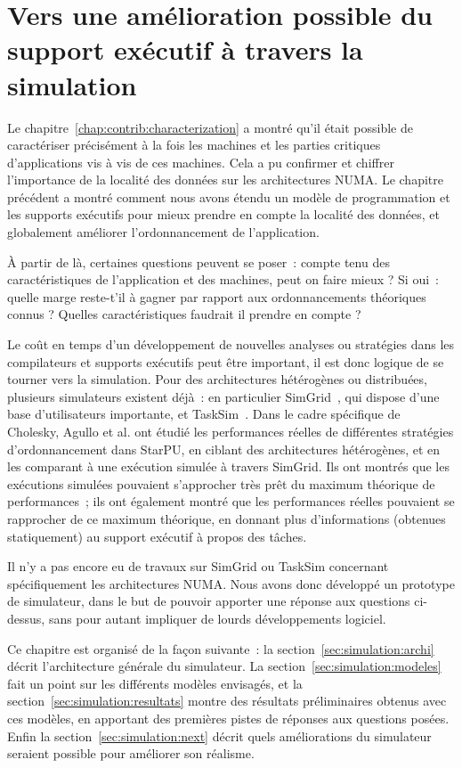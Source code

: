 \chapter{Vers une amélioration possible du support exécutif à travers la simulation}\label{chap:simulation}
\chaptertoc


Le chapitre~\ref{chap:contrib:characterization} a montré qu'il était possible de caractériser précisément à la fois les machines et les parties critiques d'applications vis à vis de ces machines.
Cela a pu confirmer et chiffrer l'importance de la localité des données sur les architectures NUMA.
Le chapitre précédent a montré comment nous avons étendu un modèle de programmation et les supports exécutifs pour mieux prendre en compte la localité des données, et globalement améliorer l'ordonnancement de l'application.

À partir de là, certaines questions peuvent se poser~: compte tenu des caractéristiques de l'application et des machines, peut on faire mieux ?
Si oui~: quelle marge reste-t'il à gagner par rapport aux ordonnancements théoriques connus ? Quelles caractéristiques faudrait il prendre en compte ?

Le coût en temps d'un développement de nouvelles analyses ou stratégies dans les compilateurs et supports exécutifs peut être important, il est donc logique de se tourner vers la simulation.
Pour des architectures hétérogènes ou distribuées, plusieurs simulateurs existent déjà~: en particulier SimGrid~\cite{Casanova2001}, qui dispose d'une base d'utilisateurs importante, et TaskSim~\cite{Rico2010}.
Dans le cadre spécifique de Cholesky, Agullo et al.\cite{Agullo2015} ont étudié les performances réelles de différentes stratégies d'ordonnancement dans StarPU, en ciblant des architectures hétérogènes, et en les comparant à une exécution simulée à travers SimGrid.
Ils ont montrés que les exécutions simulées pouvaient s'approcher très prêt du maximum théorique de performances~; ils ont également montré que les performances réelles pouvaient se rapprocher de ce maximum théorique, en donnant plus d'informations (obtenues statiquement) au support exécutif à propos des tâches.

Il n'y a pas encore eu de travaux sur SimGrid ou TaskSim concernant spécifiquement les architectures NUMA.
Nous avons donc développé un prototype de simulateur, dans le but de pouvoir apporter une réponse aux questions ci-dessus, sans pour autant impliquer de lourds développements logiciel.

Ce chapitre est organisé de la façon suivante~: la section~\ref{sec:simulation:archi} décrit l'architecture générale du simulateur.
La section~\ref{sec:simulation:modeles} fait un point sur les différents modèles envisagés, et la section~\ref{sec:simulation:resultats} montre des résultats préliminaires obtenus avec ces modèles, en apportant des premières pistes de réponses aux questions posées.
Enfin la section~\ref{sec:simulation:next} décrit quels améliorations du simulateur seraient possible pour améliorer son réalisme.


